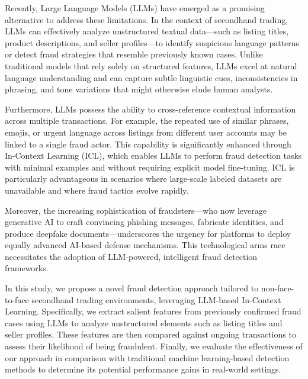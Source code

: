 \documentclass[sigconf]{acmart}
\begin{document}
Recently, Large Language Models (LLMs) have emerged as a promising alternative to address these limitations. In the context of secondhand trading, LLMs can effectively analyze unstructured textual data—such as listing titles, product descriptions, and seller profiles—to identify suspicious language patterns or detect fraud strategies that resemble previously known cases. Unlike traditional models that rely solely on structured features, LLMs excel at natural language understanding and can capture subtle linguistic cues, inconsistencies in phrasing, and tone variations that might otherwise elude human analysts.

Furthermore, LLMs possess the ability to cross-reference contextual information across multiple transactions. For example, the repeated use of similar phrases, emojis, or urgent language across listings from different user accounts may be linked to a single fraud actor. This capability is significantly enhanced through In-Context Learning (ICL), which enables LLMs to perform fraud detection tasks with minimal examples and without requiring explicit model fine-tuning. ICL is particularly advantageous in scenarios where large-scale labeled datasets are unavailable and where fraud tactics evolve rapidly.

Moreover, the increasing sophistication of fraudsters—who now leverage generative AI to craft convincing phishing messages, fabricate identities, and produce deepfake documents—underscores the urgency for platforms to deploy equally advanced AI-based defense mechanisms. This technological arms race necessitates the adoption of LLM-powered, intelligent fraud detection frameworks.

In this study, we propose a novel fraud detection approach tailored to non-face-to-face secondhand trading environments, leveraging LLM-based In-Context Learning. Specifically, we extract salient features from previously confirmed fraud cases using LLMs to analyze unstructured elements such as listing titles and seller profiles. These features are then compared against ongoing transactions to assess their likelihood of being fraudulent. Finally, we evaluate the effectiveness of our approach in comparison with traditional machine learning-based detection methods to determine its potential performance gains in real-world settings.



\end{document}
